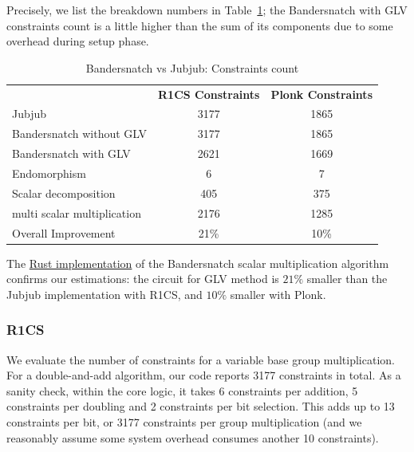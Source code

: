 \documentclass[smallextended]{svjour3}
\begin{document}
Precisely, we list the breakdown numbers in Table~\ref{tab:r1cs_full};
the  Bandersnatch with GLV constraints count is a little higher than
the sum of its components due to some overhead during setup phase.


\begin{table}[!ht]
  \centering%
  \begin{tabularx}{\textwidth}{lcc}
    & \textbf{R1CS Constraints}     & \textbf{Plonk Constraints}\\
    Jubjub& 3177 & 1865\\
    Bandersnatch without GLV& 3177 & 1865\\

    Bandersnatch with GLV&  2621&1669\\
    \quad Endomorphism & 6 & 7 \\
    \quad Scalar decomposition &  405 & 375\\
    \quad multi scalar multiplication & 2176& 1285 \\
    Overall Improvement & 21\%  & 10\% \\
  \end{tabularx}
  \caption{Bandersnatch vs Jubjub: Constraints count}
  \label{tab:r1cs_full}
\end{table}


The \href{https://github.com/zhenfeizhang/bandersnatch}{Rust implementation} of the Bandersnatch scalar multiplication
algorithm confirms our estimations: the circuit for GLV method is $21\%$ smaller
than the Jubjub implementation with R1CS, and $10\%$ smaller with Plonk.

\subsubsection{R1CS}
We evaluate the number of constraints for a 
variable base group multiplication. For a double-and-add
algorithm, 
our code reports 3177 constraints in 
total.
As a sanity check, within the core logic,
it takes 6 constraints per addition, 5 constraints
per doubling and 2 constraints per bit selection. This adds
up to 13 constraints per bit, or 3177 constraints per
group multiplication (and we reasonably assume some system overhead
consumes another 10 constraints). 
\end{document}
